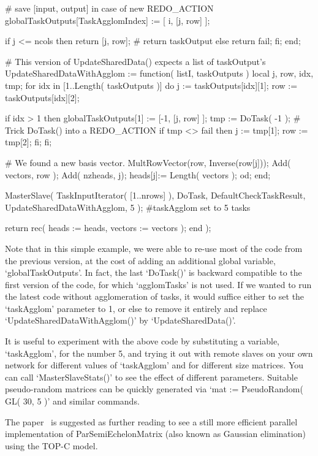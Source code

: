     # save [input, output] in case of new REDO_ACTION
    globalTaskOutputs[TaskAgglomIndex] := [ i, [j, row] ];

    if j <= ncols then return [j, row]; # return taskOutput
    else return fail; fi;
  end;
  
  # This version of UpdateSharedData() expects a list of taskOutput's
  UpdateSharedDataWithAgglom := function( listI, taskOutputs )
    local j, row, idx, tmp;
    for idx in [1..Length( taskOutputs )] do
      j := taskOutputs[idx][1];
      row := taskOutputs[idx][2];
      
      if idx > 1 then
        globalTaskOutputs[1] := [-1, [j, row] ];
        tmp := DoTask( -1 ); # Trick DoTask() into a REDO_ACTION
        if tmp <> fail then
          j := tmp[1];
          row := tmp[2];
        fi;
      fi;

      # We found a new basis vector.
      MultRowVector(row, Inverse(row[j]));
      Add( vectors, row );
      Add( nzheads, j);
      heads[j]:= Length( vectors );
    od;
  end;
    
  MasterSlave( TaskInputIterator( [1..nrows] ), DoTask, DefaultCheckTaskResult,
                UpdateSharedDataWithAgglom, 5 ); #taskAgglom set to 5 tasks

  return rec( heads   := heads,
              vectors := vectors );
end );
\endexample

Note that in this simple example, we were able to re-use most of the
code from the previous version, at the cost of adding an additional
global variable, `globalTaskOutputs'.  In fact, the last `DoTask()' is
backward compatible to the first version of the code, for which
`agglomTasks' is not used.  If we wanted to run the latest code
without agglomeration of tasks, it would suffice either to set
the `taskAgglom' parameter to 1, or else to remove it entirely and
replace `UpdateSharedDataWithAgglom()' by `UpdateSharedData()'.

It is useful to experiment with the above code by substituting a
variable, `taskAgglom', for the number 5, and trying it out with
remote slaves on your own network for different values of `taskAgglom'
and for different size matrices.  You can call `MasterSlaveStats()'
to see the effect of different parameters.  Suitable pseudo-random matrices
can be quickly generated via `mat := PseudoRandom( GL( 30, 5 )' and similar
commands.


The paper~\cite{Coo98} is suggested as further reading to see
a still more efficient parallel implementation
of ParSemiEchelonMatrix (also known as Gaussian elimination)
using the TOP-C model.

